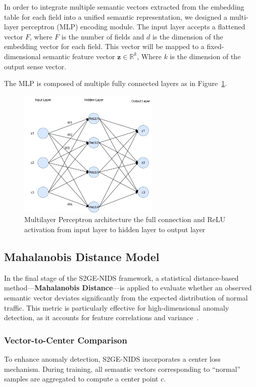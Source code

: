 \begin{ZhChapter}
    In order to integrate multiple semantic vectors extracted from the embedding table for each field into a unified semantic representation, we designed a multi-layer perceptron (MLP) encoding module. The input layer accepts a flattened vector \(F\), where \(F\) is the number of fields and \(d\) is the dimension of the embedding vector for each field. This vector will be mapped to a fixed-dimensional semantic feature vector \(\mathbf{z} \in \mathbb{R}^k\), Where \(k\) is the dimension of the output sense vector.

    The MLP is composed of multiple fully connected layers as in Figure~\ref{fig:MLP}.


    \begin{figure}[htbp]
        \centering
        \includegraphics[width = 0.6\textwidth]{image/MLP.jpg}
        \caption{Multilayer Perceptron architecture the full connection and ReLU activation from input layer to hidden layer to output layer}
        \label{fig:MLP}
    \end{figure}


    \subsection{Mahalanobis Distance Model}
    In the final stage of the S2GE-NIDS framework, a statistical distance-based method—\textbf{Mahalanobis Distance}—is applied to evaluate whether an observed semantic vector deviates significantly from the expected distribution of normal traffic. This metric is particularly effective for high-dimensional anomaly detection, as it accounts for feature correlations and variance~\cite{de2000mahalanobis}.





    \subsubsection{Vector-to-Center Comparison}
    To enhance anomaly detection, S2GE-NIDS incorporates a center loss mechanism. During training, all semantic vectors corresponding to ``normal'' samples are aggregated to compute a center point \(c\).




\end{ZhChapter}
